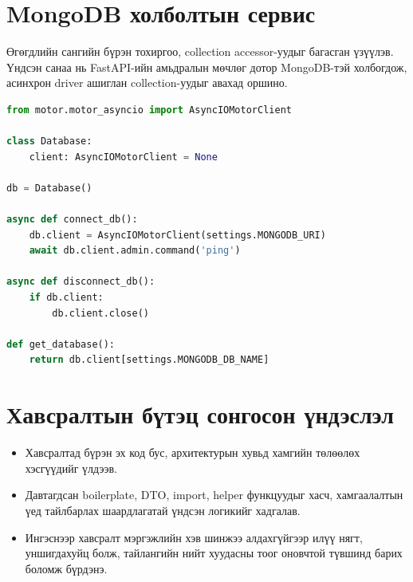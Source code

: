 \section{MongoDB холболтын сервис}

Өгөгдлийн сангийн бүрэн тохиргоо, collection accessor-уудыг багасган үзүүлэв. Үндсэн санаа нь FastAPI-ийн амьдралын мөчлөг дотор MongoDB-тэй холбогдож, асинхрон driver ашиглан collection-уудыг авахад оршино.

\begin{lstlisting}[language=Python, caption=Motor async driver ашигласан өгөгдлийн сангийн сервис]
from motor.motor_asyncio import AsyncIOMotorClient

class Database:
    client: AsyncIOMotorClient = None

db = Database()

async def connect_db():
    db.client = AsyncIOMotorClient(settings.MONGODB_URI)
    await db.client.admin.command('ping')

async def disconnect_db():
    if db.client:
        db.client.close()

def get_database():
    return db.client[settings.MONGODB_DB_NAME]
\end{lstlisting}

\section{Хавсралтын бүтэц сонгосон үндэслэл}

\begin{itemize}
    \item Хавсралтад бүрэн эх код бус, архитектурын хувьд хамгийн төлөөлөх хэсгүүдийг үлдээв.
    \item Давтагдсан boilerplate, DTO, import, helper функцуудыг хасч, хамгаалалтын үед тайлбарлах шаардлагатай үндсэн логикийг хадгалав.
    \item Ингэснээр хавсралт мэргэжлийн хэв шинжээ алдахгүйгээр илүү нягт, уншигдахуйц болж, тайлангийн нийт хуудасны тоог оновчтой түвшинд барих боломж бүрдэнэ.
\end{itemize}

\endgroup
